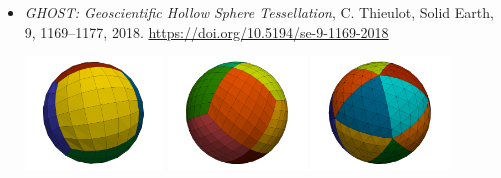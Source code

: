 \begin{itemize}
\item {\it GHOST: Geoscientific Hollow Sphere Tessellation}, 
C. Thieulot, Solid Earth, 9, 1169–1177, 2018. \url{https://doi.org/10.5194/se-9-1169-2018}

\begin{center}
\includegraphics[height=3cm]{images/mycodes/shell_HS06}
\includegraphics[height=3cm]{images/mycodes/shell_HS12}
\includegraphics[height=3cm]{images/mycodes/shell_HS20}
\end{center}

\end{itemize}

